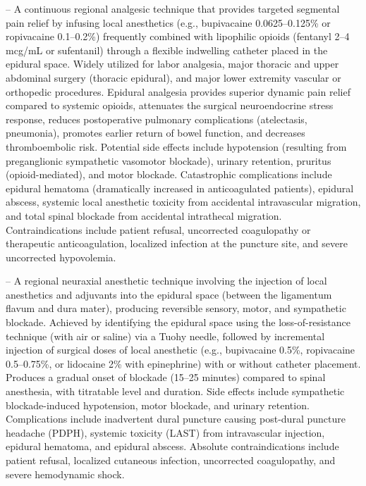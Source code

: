 -- A continuous regional analgesic technique that provides targeted segmental pain relief by infusing local anesthetics (e.g., bupivacaine 0.0625--0.125\% or ropivacaine 0.1--0.2\%) frequently combined with lipophilic opioids (fentanyl 2--4 mcg/mL or sufentanil) through a flexible indwelling catheter placed in the epidural space. Widely utilized for labor analgesia, major thoracic and upper abdominal surgery (thoracic epidural), and major lower extremity vascular or orthopedic procedures. Epidural analgesia provides superior dynamic pain relief compared to systemic opioids, attenuates the surgical neuroendocrine stress response, reduces postoperative pulmonary complications (atelectasis, pneumonia), promotes earlier return of bowel function, and decreases thromboembolic risk. Potential side effects include hypotension (resulting from preganglionic sympathetic vasomotor blockade), urinary retention, pruritus (opioid-mediated), and motor blockade. Catastrophic complications include epidural hematoma (dramatically increased in anticoagulated patients), epidural abscess, systemic local anesthetic toxicity from accidental intravascular migration, and total spinal blockade from accidental intrathecal migration. Contraindications include patient refusal, uncorrected coagulopathy or therapeutic anticoagulation, localized infection at the puncture site, and severe uncorrected hypovolemia.

-- A regional neuraxial anesthetic technique involving the injection of local anesthetics and adjuvants into the epidural space (between the ligamentum flavum and dura mater), producing reversible sensory, motor, and sympathetic blockade. Achieved by identifying the epidural space using the loss-of-resistance technique (with air or saline) via a Tuohy needle, followed by incremental injection of surgical doses of local anesthetic (e.g., bupivacaine 0.5\%, ropivacaine 0.5--0.75\%, or lidocaine 2\% with epinephrine) with or without catheter placement. Produces a gradual onset of blockade (15--25 minutes) compared to spinal anesthesia, with titratable level and duration. Side effects include sympathetic blockade-induced hypotension, motor blockade, and urinary retention. Complications include inadvertent dural puncture causing post-dural puncture headache (PDPH), systemic toxicity (LAST) from intravascular injection, epidural hematoma, and epidural abscess. Absolute contraindications include patient refusal, localized cutaneous infection, uncorrected coagulopathy, and severe hemodynamic shock.

